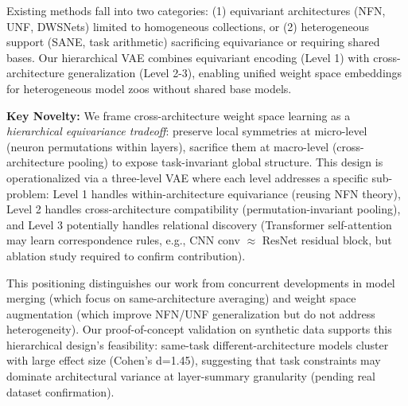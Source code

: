 Existing methods fall into two categories: (1) equivariant architectures (NFN, UNF, DWSNets) limited to homogeneous collections, or (2) heterogeneous support (SANE, task arithmetic) sacrificing equivariance or requiring shared bases. Our hierarchical VAE combines equivariant encoding (Level 1) with cross-architecture generalization (Level 2-3), enabling unified weight space embeddings for heterogeneous model zoos without shared base models.

\textbf{Key Novelty:} We frame cross-architecture weight space learning as a \textit{hierarchical equivariance tradeoff}: preserve local symmetries at micro-level (neuron permutations within layers), sacrifice them at macro-level (cross-architecture pooling) to expose task-invariant global structure. This design is operationalized via a three-level VAE where each level addresses a specific sub-problem: Level 1 handles within-architecture equivariance (reusing NFN theory), Level 2 handles cross-architecture compatibility (permutation-invariant pooling), and Level 3 potentially handles relational discovery (Transformer self-attention may learn correspondence rules, e.g., CNN conv $\approx$ ResNet residual block, but ablation study required to confirm contribution).

This positioning distinguishes our work from concurrent developments in model merging (which focus on same-architecture averaging) and weight space augmentation (which improve NFN/UNF generalization but do not address heterogeneity). Our proof-of-concept validation on synthetic data supports this hierarchical design's feasibility: same-task different-architecture models cluster with large effect size (Cohen's d=1.45), suggesting that task constraints may dominate architectural variance at layer-summary granularity (pending real dataset confirmation).
